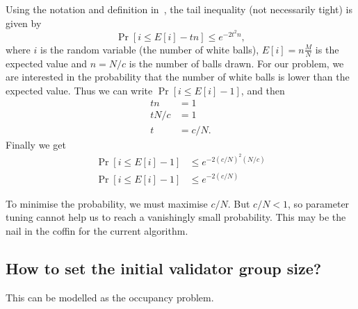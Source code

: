 Using the notation and definition in~\cite{skala2013hypergeometric}, the tail
inequality (not necessarily tight) is given by
\[
\Pr[ i \le E[i] - tn ] \le e^{-2t^2n},
\]
where $i$ is the random variable (the number of white balls), $E[i] = n
\frac{M}{N}$ is the expected value and $n = N/c$ is the number of balls drawn.
For our problem, we are interested in the probability that the number of white
balls is lower than the expected value. Thus we can write $\Pr[i \le E[i] - 1]$,
and then
\begin{align*}
  tn &= 1 \\
  tN/c &= 1 \\
  t &= c/N.
\end{align*}
Finally we get
\begin{align*}
  \Pr[ i \le E[i] - 1] &\le e^{-2 (c/N)^2 (N/c)} \\
  \Pr[ i \le E[i] - 1] &\le e^{-2 (c/N)}
\end{align*}

To minimise the probability, we must maximise $c/N$. But $c/N < 1$, so parameter
tuning cannot help us to reach a vanishingly small probability. This may be the
nail in the coffin for the current algorithm.


\subsection{How to set the initial validator group size?}
This can be modelled as the occupancy problem.


